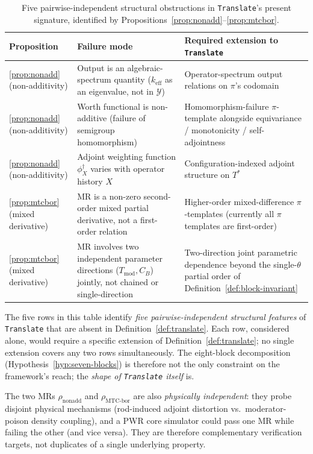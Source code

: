 \documentclass[acmsmall, screen]{acmart}
\begin{document}
\begin{table}[h]
\centering
\caption{Five pairwise-independent structural obstructions in \texttt{Translate}'s present signature, identified by Propositions~\ref{prop:nonadd}--\ref{prop:mtcbor}.}
\label{tab:five-obstructions}
\footnotesize
\begin{tabular}{p{} p{} p{}}
\toprule
\textbf{Proposition} & \textbf{Failure mode} & \textbf{Required extension to \texttt{Translate}} \\
\midrule
\ref{prop:nonadd} (non-additivity) & Output is an algebraic-spectrum quantity ($k_{\mathrm{eff}}$ as an eigenvalue, not in $\mathcal{Y}$) & Operator-spectrum output relations on $\pi$'s codomain \\
\addlinespace
\ref{prop:nonadd} (non-additivity) & Worth functional is non-additive (failure of semigroup homomorphism) & Homomorphism-failure $\pi$-template alongside equivariance / monotonicity / self-adjointness \\
\addlinespace
\ref{prop:nonadd} (non-additivity) & Adjoint weighting function $\phi^{\dagger}_{X}$ varies with operator history $X$ & Configuration-indexed adjoint structure on $T^{*}$ \\
\addlinespace
\ref{prop:mtcbor} (mixed derivative) & MR is a non-zero second-order mixed partial derivative, not a first-order relation & Higher-order mixed-difference $\pi$-templates (currently all $\pi$ templates are first-order) \\
\addlinespace
\ref{prop:mtcbor} (mixed derivative) & MR involves two independent parameter directions ($T_{\mathrm{mod}}, C_{B}$) jointly, not chained or single-direction & Two-direction joint parametric dependence beyond the single-$\theta$ partial order of Definition~\ref{def:block-invariant} \\
\bottomrule
\end{tabular}
\end{table}

The five rows in this table identify \emph{five pairwise-independent structural features} of \texttt{Translate} that are absent in Definition~\ref{def:translate}. Each row, considered alone, would require a specific extension of Definition~\ref{def:translate}; no single extension covers any two rows simultaneously. The eight-block decomposition (Hypothesis~\ref{hyp:seven-blocks}) is therefore not the only constraint on the framework's reach; the \emph{shape of \texttt{Translate} itself} is.

The two MRs $\rho_{\mathrm{nonadd}}$ and $\rho_{\mathrm{MTC\text{-}bor}}$ are also \emph{physically independent}: they probe disjoint physical mechanisms (rod-induced adjoint distortion vs.\ moderator-poison density coupling), and a PWR core simulator could pass one MR while failing the other (and vice versa). They are therefore complementary verification targets, not duplicates of a single underlying property.
\end{document}
